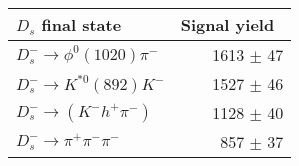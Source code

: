 \begin{tabular}{l r }
\hline\hline
$D_s$ final state  & Signal yield\ \\
\hline
$D_{s}^{-} \to \phi^{0}(1020)\pi^{-}$ & 1613 $\pm$ 47 \\
$D_{s}^{-}\to K^{*0}(892)K^{-}$ & 1527 $\pm$ 46 \\
$D_{s}^{-}\to (K^{-}h^{+}\pi^{-})$ & 1128 $\pm$ 40 \\
$D_{s}^{-}\to \pi^{+}\pi^{-}\pi^{-}$ & 857 $\pm$ 37 \\
\hline\hline
\end{tabular}
\label{table:signalYieldsDs}
